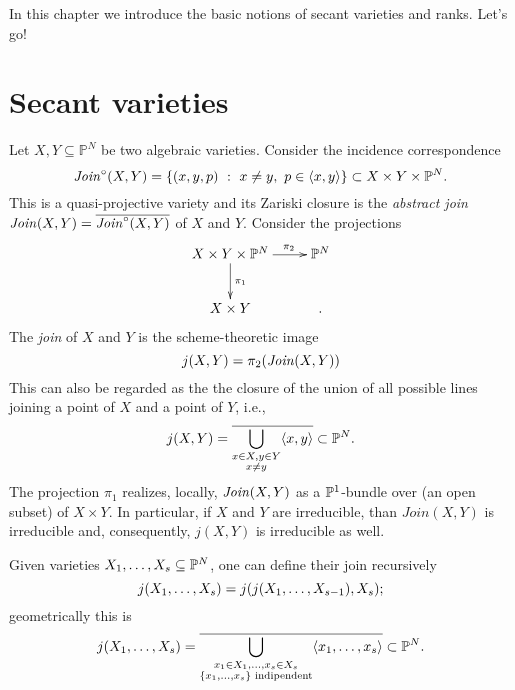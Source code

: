  In this chapter we introduce the basic notions of secant varieties and ranks. 
 Let's go!
 \section{Secant varieties}
 \label{geometrySecants-section-secants}
 
 \begin{definition}
 \label{geometrySecants-definition-join}
 Let $X,Y \subseteq \mathbb{P}^N$ be two algebraic varieties. Consider the incidence correspondence 
 \[
     \mathit{Join}^\circ(X,Y) = \{(x,y,p) ~:~ x \neq y,~p \in \langle x,y \rangle\} \subset X \times Y \times \mathbb{P}^N.
 \]
 This is a quasi-projective variety and its Zariski closure is the {\it abstract join} $\mathit{Join}(X,Y) = \overline{\mathit{Join}^\circ(X,Y)}$ of $X$ and $Y$. Consider the projections 
 \[
     \xymatrix{
         X \times Y \times \bbP^N \ar[d]^{\pi_1} \ar[r]^(0.65){\pi_2} & \bbP^N\\
         X \times Y & .
     }
 \]
 The \emph{join} of $X$ and $Y$ is the scheme-theoretic image 
 \[
     j(X,Y) = \pi_2(\mathit{Join}(X,Y))
 \]
 This can also be regarded as the the closure of the union of all possible lines joining a point of $X$ and a point of $Y$, i.e.,
 \[
     j(X,Y) = \overline{ \bigcup_{\substack{x \in X, y \in Y \\ x \neq y}} \langle x,y \rangle} \subset \mathbb{P}^N.
 \]
 The projection $\pi_1$ realizes, locally, $\mathit{Join}(X,Y)$ as a $\mathbb{P}^1$-bundle over (an open subset) of $X \times Y$. In particular, if $X$ and $Y$ are irreducible, than $Join(X,Y)$ is irreducible and, consequently, $j(X,Y)$ is irreducible as well.
 
 Given varieties $X_1 , \ldots , X_s \subseteq \mathbb{P}^N$, one can define their join recursively
 \[
     j( X_1 , \ldots , X_s) = j( j(X_1 , \ldots , X_{s-1}), X_s);
 \]
 geometrically this is 
 \[
     j( X_1 , \ldots , X_s) = \overline{\bigcup_{\substack{x_1 \in X_1,\ldots,x_s \in X_s \\ \{x_1,\ldots,x_s\} \text{ indipendent}}} \langle x_1,\ldots,x_s \rangle} \subset \mathbb{P}^N.
 \]
 \end{definition}
 

